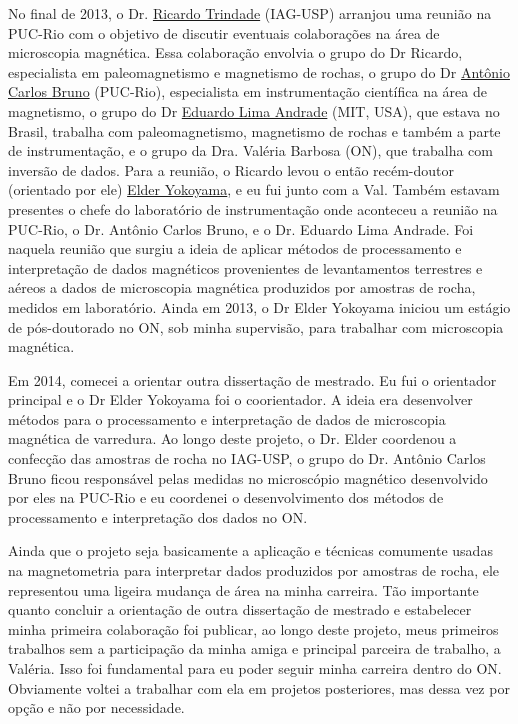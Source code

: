 No final de 2013, o Dr. \href{https://lattes.cnpq.br/3934334115083849}{Ricardo Trindade} (IAG-USP) arranjou uma reunião na
PUC-Rio com o objetivo de discutir eventuais colaborações na área de microscopia
magnética. Essa colaboração envolvia o grupo do Dr Ricardo, especialista em
paleomagnetismo e magnetismo de rochas, o grupo do Dr \href{https://lattes.cnpq.br/8840926029509231}{Antônio Carlos Bruno}
(PUC-Rio), especialista em instrumentação científica na área de magnetismo,
o grupo do Dr \href{https://eapsweb.mit.edu/people/limaea}{Eduardo Lima Andrade} (MIT, USA), que estava no Brasil, trabalha com paleomagnetismo,
magnetismo de rochas e também a parte de instrumentação, e o grupo da Dra. Valéria
Barbosa (ON), que trabalha com inversão de dados.
Para a reunião, o Ricardo levou o então recém-doutor (orientado por ele)
\href{https://lattes.cnpq.br/9806242954314478}{Elder Yokoyama}, e eu fui junto com a 
Val. Também estavam presentes o chefe
do laboratório de instrumentação onde aconteceu a reunião na PUC-Rio, o Dr.
Antônio Carlos Bruno, e o Dr. Eduardo Lima Andrade.
Foi naquela reunião que surgiu a ideia de aplicar métodos de processamento e
interpretação de dados magnéticos provenientes de levantamentos terrestres e 
aéreos a dados de microscopia magnética produzidos por amostras de rocha,
medidos em laboratório.
Ainda em 2013, o Dr Elder Yokoyama iniciou um estágio de pós-doutorado no ON,
sob minha supervisão, para trabalhar com microscopia magnética.

Em 2014, comecei a orientar outra dissertação de mestrado. 
Eu fui o orientador principal e o Dr Elder Yokoyama foi o coorientador. 
A ideia era desenvolver métodos para o processamento e interpretação 
de dados de microscopia magnética de varredura. Ao longo deste projeto, o Dr. Elder
coordenou a confecção das amostras de rocha no IAG-USP, o grupo do Dr. Antônio Carlos Bruno
ficou responsável pelas medidas no microscópio magnético desenvolvido por eles na PUC-Rio 
e eu coordenei o desenvolvimento dos métodos de processamento e interpretação dos dados
no ON.

Ainda que o projeto seja basicamente a aplicação e técnicas comumente usadas na 
magnetometria para interpretar dados produzidos por amostras de rocha, ele representou 
uma ligeira mudança de área na minha carreira. Tão importante quanto concluir a 
orientação de outra dissertação de mestrado e estabelecer minha primeira colaboração foi 
publicar, ao longo deste projeto, meus primeiros trabalhos sem a participação da 
minha amiga e principal parceira de trabalho, a Valéria. Isso foi fundamental para 
eu poder seguir minha carreira dentro do ON. Obviamente voltei a 
trabalhar com ela em projetos posteriores, mas dessa vez por opção e não por necessidade.

